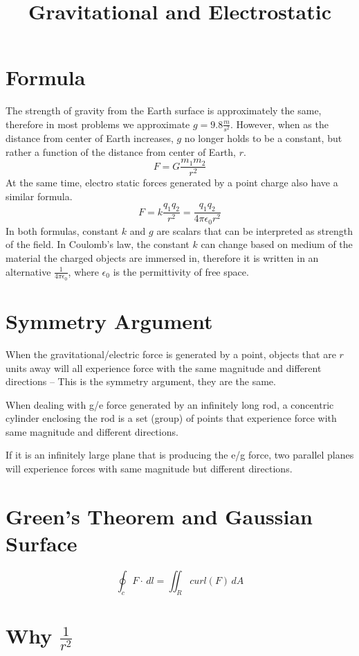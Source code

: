 \documentclass[]{article}
\title{Gravitational and Electrostatic}
\author{}
\begin{document}
	
	
	


\maketitle


\section{Formula}
The strength of gravity from the Earth surface is approximately the same, therefore in most problems we approximate $g=9.8\frac{m}{s^2}$. However, when as the distance from center of Earth increases, $g$ no longer holds to be a constant, but rather a function of the distance from center of Earth, $r$.
$$F = G \frac{m_1m_2}{r^2}$$
At the same time, electro static forces generated by a point charge also have a similar formula.
$$F = k\frac{q_1q_2}{r^2} = \frac{q_1q_2}{4\pi\epsilon_0 r^2}$$
In both formulas, constant $k$ and $g$ are scalars that can be interpreted as strength of the field. In Coulomb's law, the constant $k$ can change based on medium of the material the charged objects are immersed in, therefore it is written in an alternative $\frac{1}{4\pi\epsilon_0}$, where $\epsilon_0$ is the permittivity of free space. 

\section{Symmetry Argument}
When the gravitational/electric force is generated by a point, objects that are $r$ units away will all experience force with the same magnitude and different directions -- This is the symmetry argument, they are the same.   

When dealing with g/e force generated by an infinitely long rod, a concentric cylinder enclosing the rod is a set (group) of points that experience force with same magnitude and different directions.

If it is an infinitely large plane that is producing the e/g force, two parallel planes will experience forces with same magnitude but different directions.

\section{Green's Theorem and Gaussian Surface }
$$\oint_c F \cdot \,dl = \iint_R curl(F) \,dA  $$

\section{Why $\frac{1}{r^2}$}
\end{document}
